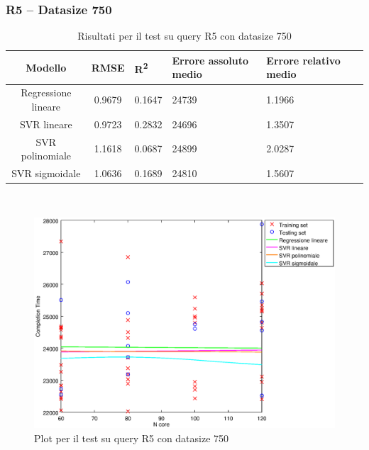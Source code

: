 \documentclass[a4paper,11pt]{article}
\begin{document}
\subsubsection{R5 -- Datasize 750}
\begin{table}[bhpt]
	\centering
	\begin{adjustbox}{center}
		\begin{tabular}{c | c M{1.2cm} M{2.5cm} M{2.5cm} M{1.8cm}}
			Modello & RMSE & R\textsuperscript{2} & Errore assoluto medio & Errore relativo medio \tabularnewline
			\hline
			Regressione lineare & 0.9679 & 0.1647 &  24739 & 1.1966 \\
			SVR lineare & 0.9723 & 0.2832 &  24696 & 1.3507 \\
			SVR polinomiale & 1.1618 & 0.0687 &  24899 & 2.0287 \\
			SVR sigmoidale & 1.0636 & 0.1689 &  24810 & 1.5607 \\
		\end{tabular}
	\end{adjustbox}
	\\
	\caption{Risultati per il test su query R5 con datasize 750}
	\label{table_R5_750}
\end{table}

\begin {figure}[hbtp]
\centering
\includegraphics[width=\textwidth]{output/R5_750/plot_R5_750.eps}
\caption {Plot per il test su query R5 con datasize 750}
\end {figure}
\newpage
\end{document}
